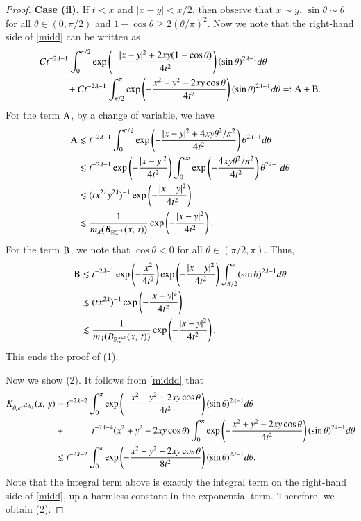 \documentclass[12pt]{amsart}
\begin{document}
\begin{proof}
{\bf Case (ii).} If $t< x$ and $|x-y|< x/2$, then observe that $x\sim y$, $\sin\theta\sim \theta$ for all $\theta\in (0,\pi/2)$ and $1-\cos\theta\geq 2(\theta/\pi)^2$. Now we note that the right-hand side of \eqref{midd} can be written as
\begin{align*}
&Ct^{-2\lambda-1}\int_0^{\pi/2} \exp\left(-\frac{|x-y|^2+2xy(1-\cos\theta)}{4t^2}\right)(\sin\theta)^{2\lambda-1}d\theta\\
&\hspace{1.0cm}+Ct^{-2\lambda-1}\int_{\pi/2}^\pi \exp\left(-\frac{x^2+y^2-2xy\cos\theta}{4t^2}\right)(\sin\theta)^{2\lambda-1}d\theta=:{\rm A}+{\rm B}.
\end{align*}
For the term ${\rm A}$, by a change of variable, we have
\begin{align*}
{\rm A}&\lesssim t^{-2\lambda-1}\int_0^{\pi/2} \exp\left(-\frac{|x-y|^2+4xy\theta^2/\pi^2}{4t^2}\right)\theta^{2\lambda-1}d\theta\\
&\lesssim t^{-2\lambda-1}\exp\left(-\frac{|x-y|^2}{4t^2}\right)\int_0^{\infty} \exp\left(-\frac{4xy\theta^2/\pi^2}{4t^2}\right)\theta^{2\lambda-1}d\theta\\
&\lesssim (tx^{2\lambda}y^{2\lambda})^{-1}\exp\left(-\frac{|x-y|^2}{4t^2}\right)\\
&\lesssim \frac{1}{m_\lambda(B_{\mathbb{R}_+^{n+1}}(x,\,t))}\exp\left(-\frac{|x-y|^2}{4t^2}\right).
\end{align*}
For the term ${\rm B}$, we note that $\cos\theta<0$ for all $\theta\in (\pi/2,\pi)$. Thus,
\begin{align*}
{\rm B}&\lesssim t^{-2\lambda-1}\exp\left(-\frac{x^2}{4t^2}\right)\exp\left(-\frac{|x-y|^2}{4t^2}\right)\int_{\pi/2}^\pi (\sin\theta)^{2\lambda-1}d\theta\\
&\lesssim (tx^{2\lambda})^{-1}\exp\left(-\frac{|x-y|^2}{4t^2}\right)\\
&\lesssim \frac{1}{m_\lambda(B_{\mathbb{R}_+^{n+1}}(x,\,t))}\exp\left(-\frac{|x-y|^2}{4t^2}\right).
\end{align*}
This ends the proof of (1).

Now we show (2). It follows from \eqref{middd} that
\begin{align}\label{t2220}
K_{\partial_te^{-t^2 \Delta_\lambda}}(x,\,y)
&\sim  t^{-2\lambda-2}\int_0^\pi \exp\left(-\frac{x^2+y^2-2xy\cos\theta}{4t^2}\right)(\sin\theta)^{2\lambda-1}d\theta\nonumber\\
&+\hspace{1.0cm} t^{-2\lambda-4}(x^2+y^2-2xy\cos\theta)\int_0^\pi \exp\left(-\frac{x^2+y^2-2xy\cos\theta}{4t^2}\right)(\sin\theta)^{2\lambda-1}d\theta\nonumber\\
&\lesssim t^{-2\lambda-2}\int_0^\pi \exp\left(-\frac{x^2+y^2-2xy\cos\theta}{8t^2}\right)(\sin\theta)^{2\lambda-1}d\theta.
\end{align}
Note that the integral term above is exactly the integral term on the right-hand side of \eqref{midd}, up a harmless constant in the exponential term. Therefore, we obtain (2).


\end{proof}
\end{document}

